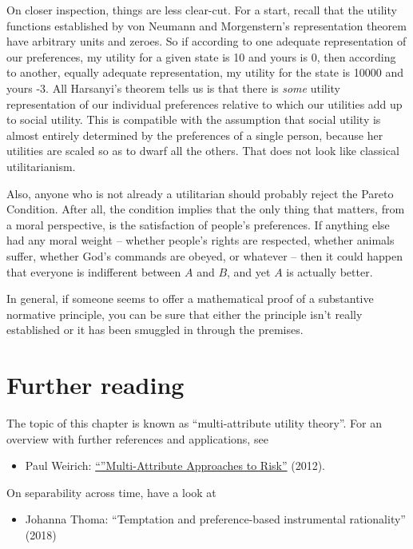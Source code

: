 On closer inspection, things are less clear-cut. For a start, recall
that the utility functions established by von Neumann and
Morgenstern's representation theorem have arbitrary units and
zeroes. So if according to one adequate representation of our
preferences, my utility for a given state is 10 and yours is 0, then
according to another, equally adequate representation, my utility for
the state is 10000 and yours -3. All Harsanyi's theorem tells us is
that there is \emph{some} utility representation of our individual
preferences relative to which our utilities add up to social
utility. This is compatible with the assumption that social utility is
almost entirely determined by the preferences of a single person,
because her utilities are scaled so as to dwarf all the others. That
does not look like classical utilitarianism.

Also, anyone who is not already a utilitarian should probably reject
the Pareto Condition. After all, the condition implies that the only
thing that matters, from a moral perspective, is the satisfaction of
people's preferences. If anything else had any moral weight -- whether
people's rights are respected, whether animals suffer, whether God's
commands are obeyed, or whatever -- then it could happen that everyone
is indifferent between $A$ and $B$, and yet $A$ is actually better.


In general, if someone seems to offer a mathematical proof
of a substantive normative principle, you can be sure that either the
principle isn't really established or it has been smuggled in through
the premises. 


\section{Further reading}

The topic of this chapter is known as ``multi-attribute utility theory''. For an
overview with further references and applications, see
\begin{itemize}
  \item Paul Weirich:
  \href{https://doi.org/10.1007/978-94-007-1433-5_20}{``''Multi-Attribute
    Approaches to Risk''} (2012).
\end{itemize}

On separability across time, have a look at
\begin{itemize}
  \item Johanna Thoma: ``Temptation and preference-based instrumental rationality'' (2018)
\end{itemize}

